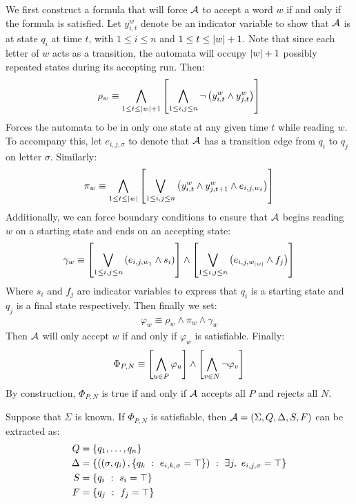 We first construct a formula that will force \(\mathcal{A}\) to accept
a word \(w\) if and only if the formula is satisfied.
Let \(y_{i, t}^w\) denote be an indicator variable
to show that \(\mathcal{A}\) is at state \(q_i\) at time \(t\),
with \(1 \leq i \leq n\) and \(1 \leq t \leq \left\lvert w\right\rvert + 1\).
Note that since each letter of \(w\) acts as a transition,
the automata will occupy \(\left\lvert w\right\rvert + 1\) possibly repeated
states during its accepting run.
Then:
\begin{align*}
  \rho_w \equiv
    \bigwedge_{1 \leq t \leq \left\lvert w\right\rvert + 1}
      \left[\bigwedge_{1 \leq i, j \leq n}
        \neg \left(y_{i, t} ^w \land y_{j, t} ^w\right)\right]
\end{align*}
Forces the automata to be in only one state at any given time \(t\)
while reading \(w\).
To accompany this, let \(e_{i, j, \sigma}\) to denote
that \(\mathcal{A}\) has a transition edge from \(q_i\) to \(q_j\)
on letter \(\sigma\).
Similarly:
\begin{align*}
  \pi_w \equiv
    \bigwedge_{1 \leq t \leq \left\lvert w\right\rvert}
      \left[\bigvee_{1 \leq i, j \leq n}
      \left(y_{i, t} ^w \land y_{j, t + 1} ^w \land e_{i, j, w_t}\right)\right]
\end{align*}
Additionally, we can force boundary conditions to ensure that \(\mathcal{A}\)
begins reading \(w\) on a starting state and ends on an accepting state:
\begin{align*}
  \gamma_{w} \equiv
    \left[\bigvee_{1 \leq i, j \leq n}
        \left(e_{i, j, w_{1}} \land s_i\right)\right]
      \land
    \left[\bigvee_{1 \leq i, j \leq n}
        \left(e_{i, j, w_{\left\lvert w\right\rvert}} \land f_j\right)\right]
\end{align*}
Where \(s_i\) and \(f_j\) are indicator variables to express that
\(q_i\) is a starting state and \(q_j\) is a final state respectively.
Then finally we set:
\begin{align*}
  \varphi_{w} \equiv \rho_w \land \pi_w \land \gamma_w
\end{align*}
Then \(\mathcal{A}\) will only accept \(w\) if and only if \(\varphi_w\)
is satisfiable.
Finally:
\begin{align*}
  \Phi_{P, N} \equiv
    \left[\bigwedge_{u \in P} \varphi_u\right]
      \land
    \left[\bigwedge_{v \in N} \neg \varphi_v\right]
\end{align*}
By construction, \(\Phi_{P, N}\) is true if and only if \(\mathcal{A}\)
accepts all \(P\) and rejects all \(N\).

Suppose that \(\Sigma\) is known.
If \(\Phi_{P, N}\) is satisfiable,
then \(\mathcal{A} = \left(\Sigma, Q, \Delta, S, F\right)\) can be extracted as:
\begin{align*}
  Q &= \left\{q_1, \ldots, q_n\right\} \\
  \Delta &=
    \left\{\left(\left(\sigma, q_i\right),
                    \left\{q_k \  : \  e_{i, k, \sigma} = \top\right\}\right)
            \  : \  \exists j, \  e_{i, j, \sigma} = \top\right\} \\
  S &= \left\{q_i \  : \  s_i = \top\right\} \\
  F &= \left\{q_j \  : \  f_j = \top\right\}
\end{align*}

